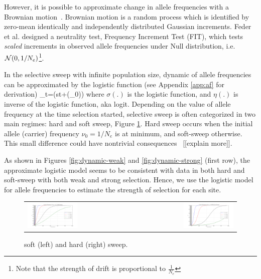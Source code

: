 \documentclass[11pt]{article}
\begin{document}
However, it is possible to approximate change in allele frequencies
with a Brownian motion~\cite{Ewens2012Mathematical}. 
Brownian motion is a random process which is identified by zero-mean 
identically and independently distributed Gaussian increments. Feder et al. 
\cite{feder2014Identifying} designed a neutrality test, Frequency Increment 
Test (FIT), which tests \emph{scaled} increments in observed allele frequencies 
under Null distribution, i.e. ${\cal N}(0,1/N_e)$\footnote{Note that the strength of 
drift is proportional to $\frac{1}{N_e}$}.

In the selective sweep with infinite population size, dynamic of allele frequencies 
can be approximated by the logistic function (see Appendix \ref{app:af} for 
derivation)
\beq
\nu_t=\sigma(st+\eta(\nu_0))\label{eq:nut}
\eeq
where $\sigma(.)$ is the logistic function, and $\eta(.)$ is inverse of the 
logistic 
function, aka logit.
Depending on the 
value of allele frequency at the time selection started, selective sweep is often 
categorized in two main regimes: hard and soft sweep, Figure \ref{fig:sweep}. 
Hard sweep occurs when the initial allele (carrier) frequency $\nu_0=1/N_e$ is 
at 
minimum, and soft-sweep otherwise. This small difference could have nontrivial
consequences~\cite{schrider2015soft} [[explain more]].

As shown in Figures \ref{fig:dynamic-weak} and \ref{fig:dynamic-strong} (first 
row), the approximate logistic model seems to be consistent with data in both 
hard and soft-sweep with both weak and strong selection. Hence, we use the 
logistic model for allele frequencies to estimate the strength of selection for each 
site.
\begin{figure}[t]
	\begin{tabular}{lr}
		\centering
		\includegraphics[trim={2in 0.1in 1.5in 
			0in},clip,page=2,width=0.5\textwidth]{sigmoidSoft}
		&\includegraphics[trim={2in 0.1in 1.9in 
			0in},clip,page=2,width=0.5\textwidth]{sigmoidHard}
	\end{tabular}
	\caption{soft (left) and hard (right) sweep.} 	 \label{fig:sweep}
\end{figure}
\end{document}
